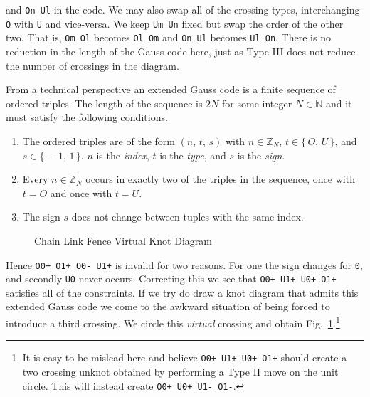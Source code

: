         and \texttt{On Ul} in the code. We may also swap all of the crossing
        types, interchanging \texttt{O} with \texttt{U} and vice-versa.
        We keep \texttt{Um Un} fixed but swap the order of the other two.
        That is, \texttt{Om Ol} becomes \texttt{Ol Om} and
        \texttt{On Ul} becomes \texttt{Ul On}. There is no reduction in the
        length of the Gauss code here, just as Type III does not reduce the
        number of crossings in the diagram.
        \par\hfill\par
        From a technical perspective an extended Gauss code is a
        finite sequence of ordered triples. The length of the sequence is
        $2N$ for some integer $N\in\mathbb{N}$ and it must satisfy
        the following conditions.
        \begin{enumerate}
            \item
                The ordered triples are of the form $(n,\,t,\,s)$ with
                $n\in\mathbb{Z}_{N}$, $t\in\{\,O,\,U\,\}$, and
                $s\in\{\,-1,\,1\,\}$. $n$ is the \textit{index}, $t$ is the
                \textit{type}, and $s$ is the \textit{sign}.
            \item
                Every $n\in\mathbb{Z}_{N}$ occurs in exactly two of the
                triples in the sequence, once with $t=O$ and once with
                $t=U$.
            \item
                The sign $s$ does not change between tuples with the same
                index.
        \end{enumerate}
        \begin{figure}
            \centering
            \caption{Chain Link Fence Virtual Knot Diagram}
            \label{fig:chain_link_fence_knot_virtual}
        \end{figure}
        Hence \texttt{O0+ O1+ O0- U1+} is invalid for two reasons. For one
        the sign changes for \texttt{0}, and secondly \texttt{U0} never occurs.
        Correcting this we see that \texttt{O0+ U1+ U0+ O1+} satisfies all of
        the constraints. If we try do draw a knot diagram that admits this
        extended Gauss code we come to the awkward situation of being forced
        to introduce a third crossing. We circle this \textit{virtual} crossing
        and obtain Fig.~\ref{fig:chain_link_fence_knot_virtual}.\footnote{%
            It is easy to be mislead here and believe
            \texttt{O0+ U1+ U0+ O1+} should create a two crossing unknot
            obtained by performing a Type II move on the unit circle. This will
            instead create \texttt{O0+ U0+ U1- O1-}.
        }
